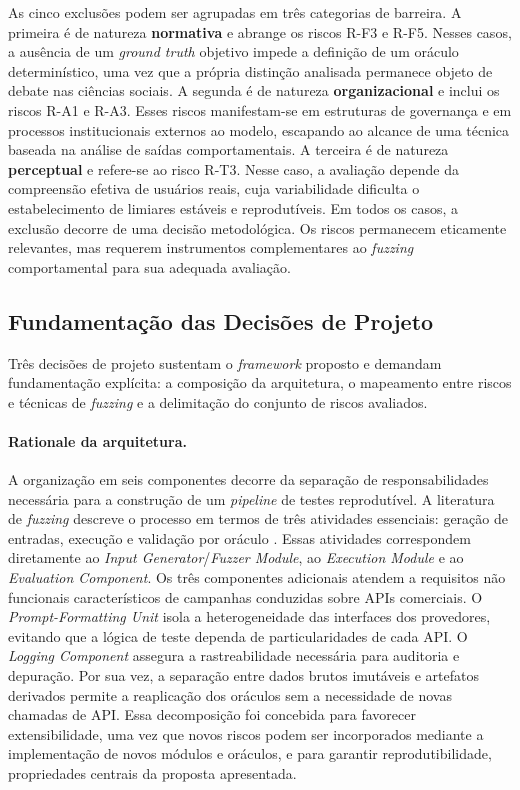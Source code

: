 As cinco exclusões podem ser agrupadas em três categorias de barreira. A primeira é de natureza \textbf{normativa} e abrange os riscos R-F3 e R-F5. Nesses casos, a ausência de um \textit{ground truth} objetivo impede a definição de um oráculo determinístico, uma vez que a própria distinção analisada permanece objeto de debate nas ciências sociais. A segunda é de natureza \textbf{organizacional} e inclui os riscos R-A1 e R-A3. Esses riscos manifestam-se em estruturas de governança e em processos institucionais externos ao modelo, escapando ao alcance de uma técnica baseada na análise de saídas comportamentais. A terceira é de natureza \textbf{perceptual} e refere-se ao risco R-T3. Nesse caso, a avaliação depende da compreensão efetiva de usuários reais, cuja variabilidade dificulta o estabelecimento de limiares estáveis e reprodutíveis. Em todos os casos, a exclusão decorre de uma decisão metodológica. Os riscos permanecem eticamente relevantes, mas requerem instrumentos complementares ao \textit{fuzzing} comportamental para sua adequada avaliação.

\subsection{Fundamentação das Decisões de Projeto}
\label{sec:fundamentacao_decisoes}

Três decisões de projeto sustentam o \textit{framework} proposto e demandam fundamentação explícita: a composição da arquitetura, o mapeamento entre riscos e técnicas de \textit{fuzzing} e a delimitação do conjunto de riscos avaliados.

\paragraph{Rationale da arquitetura.} A organização em seis componentes decorre da separação de responsabilidades necessária para a construção de um \textit{pipeline} de testes reprodutível. A literatura de \textit{fuzzing} descreve o processo em termos de três atividades essenciais: geração de entradas, execução e validação por oráculo \cite{Manes2021}. Essas atividades correspondem diretamente ao \textit{Input Generator}/\textit{Fuzzer Module}, ao \textit{Execution Module} e ao \textit{Evaluation Component}. Os três componentes adicionais atendem a requisitos não funcionais característicos de campanhas conduzidas sobre APIs comerciais. O \textit{Prompt-Formatting Unit} isola a heterogeneidade das interfaces dos provedores, evitando que a lógica de teste dependa de particularidades de cada API. O \textit{Logging Component} assegura a rastreabilidade necessária para auditoria e depuração. Por sua vez, a separação entre dados brutos imutáveis e artefatos derivados permite a reaplicação dos oráculos sem a necessidade de novas chamadas de API. Essa decomposição foi concebida para favorecer extensibilidade, uma vez que novos riscos podem ser incorporados mediante a implementação de novos módulos e oráculos, e para garantir reprodutibilidade, propriedades centrais da proposta apresentada.

